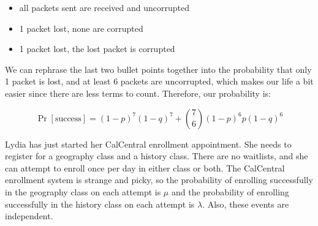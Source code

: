 \documentclass[11pt]{article}
\begin{document}
\begin{Parts}
\begin{solution}
	\begin{itemize}
		\item all packets sent are received and uncorrupted
		\item 1 packet lost, none are corrupted
		\item 1 packet lost, the lost packet is corrupted
	\end{itemize}

	We can rephrase the last two bullet points together into the probability that only 1 packet is lost, and at least 6 packets are uncorrupted, which makes our life a bit easier since there are less terms to count. Therefore, our probability is:

	\[ \Pr[\text{success}] = (1-p)^7(1-q)^7 + {7 \choose 6} (1-p)^6 p (1-q)^6\]
\end{solution}
\end{Parts}

\pagebreak
{}
Lydia has just started her CalCentral enrollment appointment. 
She needs to register for a geography class and a history class. 
There are no waitlists, and she can attempt to enroll once per day in either class or both. 
The CalCentral enrollment system is strange and picky, so the probability of enrolling successfully in the geography class on each attempt is $\mu$ and the probability of enrolling successfully in the history class on each attempt is $\lambda$.
Also, these events are independent. 
\end{document}
